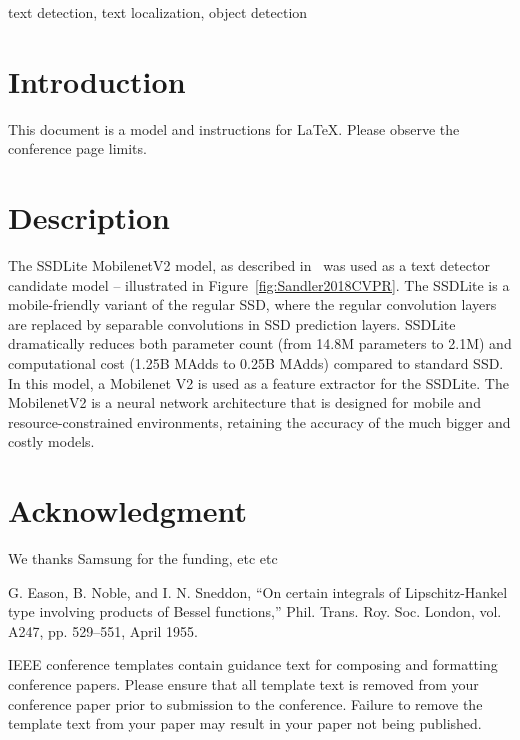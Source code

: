 \documentclass[conference]{IEEEtran}
\begin{document}
\begin{IEEEkeywords}
text detection, text localization, object detection
\end{IEEEkeywords}

\section{Introduction}
This document is a model and instructions for \LaTeX.
Please observe the conference page limits. 

\section{Description}

The SSDLite MobilenetV2 model, as described in~\cite{Sandler2018CVPR} was used as a text detector candidate model -- illustrated in Figure~\ref{fig:Sandler2018CVPR}. The SSDLite is a  mobile-friendly variant of the regular SSD, where the regular convolution layers are replaced by separable convolutions in SSD prediction layers. SSDLite dramatically reduces both parameter count (from 14.8M parameters to 2.1M) and computational cost (1.25B MAdds to 0.25B MAdds) compared to standard SSD. In this model, a Mobilenet V2 is used as a feature extractor for the SSDLite. 
The MobilenetV2 is a neural network architecture that is designed for mobile and resource-constrained environments, retaining the accuracy of the much bigger and costly models.

\section*{Acknowledgment}
We thanks Samsung for the funding, etc etc 

\begin{thebibliography}{00}
 G. Eason, B. Noble, and I. N. Sneddon, ``On certain integrals of Lipschitz-Hankel type involving products of Bessel functions,'' Phil. Trans. Roy. Soc. London, vol. A247, pp. 529--551, April 1955.

\end{thebibliography}
\vspace{12pt}
\color{red}
IEEE conference templates contain guidance text for composing and formatting conference papers. Please ensure that all template text is removed from your conference paper prior to submission to the conference. Failure to remove the template text from your paper may result in your paper not being published.
\end{document}

